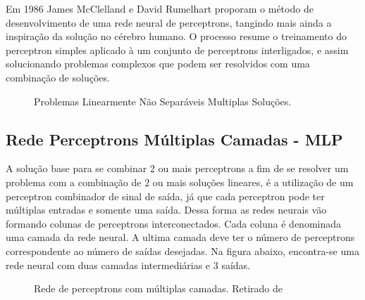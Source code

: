 \documentclass[	12pt, Times, openright, twoside, a4paper, english, brazil]{abntex2}
\begin{document}
	  	 Em 1986 James McClelland e David Rumelhart proporam o método de desenvolvimento de uma rede neural de perceptrons, tangindo mais ainda a inspiração da solução no cérebro humano. O processo resume o treinamento do perceptron simples aplicado à um conjunto de perceptrons interligados, e assim solucionando problemas complexos que podem ser resolvidos com uma combinação de soluções.
	  	  
  	  	  \begin{figure}[!ht]
  	  	  \caption{Problemas Linearmente Não Separáveis Multiplas Soluções. \label{fig:doisPerceptrons}}
  	  	   \end{figure}
  	    \subsection{Rede Perceptrons Múltiplas Camadas - MLP}
  	       
  	       A solução base para se combinar 2 ou mais perceptrons a fim de se resolver um problema com a combinação de 2 ou mais soluções lineares, é a utilização de um perceptron combinador de sinal de saída, já que cada perceptron pode ter múltiplas entradas e somente uma saída. Dessa forma as redes neurais vão formando colunas de perceptrons interconectados. Cada coluna é denominada uma camada da rede neural. A ultima camada deve ter o número de perceptrons correspondente ao número de saídas desejadas. Na figura abaixo, encontra-se uma rede neural com duas camadas intermediárias e 3 saídas.
  	       
  	       \begin{figure}[!ht]
  	       	\caption{Rede de perceptrons com múltiplas camadas. Retirado de \cite{Almeida2013}\label{fig:MLP}}
  	       \end{figure}
         
\end{document}
